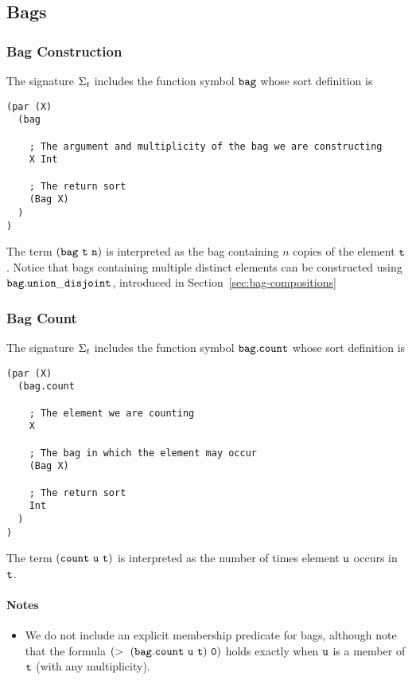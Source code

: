 \documentclass[english,a4paper,10pt]{article}
\begin{document}
\subsection{Bags}

\subsubsection{Bag Construction}
The signature $\Sigma_{t}$ includes 
the function symbol ${\tt bag}$ whose sort definition is
\begin{verbatim}
(par (X) 
  (bag
  
    ; The argument and multiplicity of the bag we are constructing
    X Int
    
    ; The return sort
    (Bag X)
  )
)
\end{verbatim}
The term ${\tt (bag\ t\ n)}$ is
interpreted as the bag containing $n$ copies of the element ${\tt t}$.
Notice that bags containing multiple distinct elements
can be constructed using ${\tt bag.union\_disjoint}$,
introduced in Section~\ref{sec:bag-compositions}

\subsubsection{Bag Count}
The signature $\Sigma_{t}$ includes 
the function symbol ${\tt bag.count}$ whose sort definition is
\begin{verbatim}
(par (X)
  (bag.count 
  
    ; The element we are counting
    X 
    
    ; The bag in which the element may occur
    (Bag X)
    
    ; The return sort
    Int
  )
)
\end{verbatim}
The term ${\tt (count\ u\ t)}$ is
interpreted as the number of times element ${\tt u}$ occurs in ${\tt t}$.

\paragraph{Notes}
\begin{itemize}
\item
We do not include an explicit membership predicate for bags, although note that
the formula $\syntax{(>\ (bag.count\ u\ t)\ 0)}$ holds exactly when ${\tt u}$
is a member of ${\tt t}$ (with any multiplicity).
\end{itemize}
\end{document}
